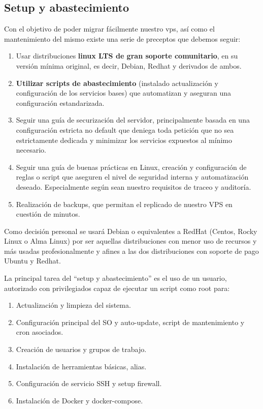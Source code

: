 \subsection{Setup y abastecimiento}\label{S:setup_abastecimiento}
Con el objetivo de poder migrar fácilmente nuestro vps, así como el mantenimiento del mismo existe una serie de preceptos que debemos seguir:
\begin{enumerate}
    \item Usar distribuciones \textbf{linux LTS de gran soporte comunitario}, en su versión mínima original, es decir, Debian,  Redhat y derivados de ambos.
    \item \textbf{Utilizar scripts de abastecimiento} (instalado actualización y configuración de los servicios bases) que automatizan y aseguran una configuración estandarizada.
    \item Seguir una guía de securización del servidor, principalmente basada en una configuración estricta no default que deniega toda petición que no sea estrictamente dedicada y minimizar los servicios expuestos al mínimo necesario.
    \item Seguir una guía de buenas prácticas en Linux, creación y configuración de reglas o script que aseguren el nivel de seguridad interna y automatización deseado. Especialmente según sean nuestro requisitos de traceo y auditoría.
    \item Realización de backups, que permitan el replicado de nuestro VPS en cuestión de minutos.
\end{enumerate}
Como decisión personal se usará Debian o equivalentes a RedHat (Centos, Rocky Linux o Alma Linux) por ser aquellas distribuciones con menor uso de recursos y más usadas profesionalmente y afines a las dos distribuciones con soporte de pago Ubuntu y Redhat. 

La principal tarea del “setup y abastecimiento” es el uso de un usuario, autorizado con privilegiados capaz de ejecutar un script como root para:
\begin{enumerate}
    \item Actualización y limpieza del sistema.
    \item Configuración principal del SO y auto-update, script de mantenimiento y cron asociados.
    \item Creación de usuarios y grupos de trabajo.
    \item Instalación de herramientas básicas, alias.
    \item Configuración de servicio SSH y setup firewall.
    \item Instalación de Docker y docker-compose.
    
\end{enumerate}

